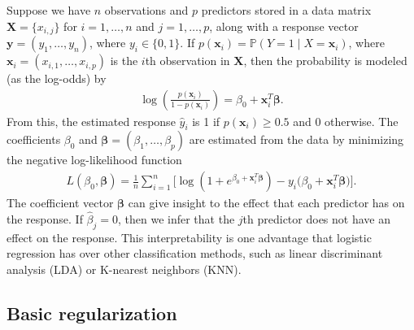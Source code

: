 \documentclass[11pt]{article}
\begin{document}
Suppose we have $n$ observations and $p$ predictors stored in a data matrix $\mathbf{X} = \{ x_{i,j} \}$ for $i = 1, \ldots, n$ and $j = 1, \ldots, p$, along with a response vector $\mathbf{y} = (y_1, \ldots, y_n)$, where $y_i \in \{ 0,1 \}$. If $p(\bm{x}_i) = \mathbb{P}(Y = 1 \mid X = \bm{x}_i)$, where $\bm{x}_i = (x_{i,1}, \ldots, x_{i,p})$ is the $i$th observation in $\mathbf{X}$,
then the probability is modeled (as the log-odds) by
\begin{align}
    \label{logprob}
    \log \left( \frac{p(\bm{x}_i)}{1 - p(\bm{x}_i)} \right) = \beta_0 + \bm{x}_i^T \bm{\beta}.
\end{align}
From this, the estimated response $\hat{y}_i$ is 1 if $p(\bm{x}_i) \ge 0.5$ and 0 otherwise. The coefficients $\beta_0$ and $\bm{\beta} = (\beta_1, \ldots, \beta_p)$ are estimated from the data by minimizing the negative log-likelihood function
\begin{align}
\label{negloglike}
    L (\beta_0, \bm{\beta}) = \frac{1}{n} \sum_{i = 1}^n \Big[ \log \left(1 + e^{\beta_0 + \bm{x}_i^T \bm{\beta}}  \right)  - y_i \big(\beta_0 + \bm{x}_i^T \bm{\beta} \big)\Big].
\end{align}
The coefficient vector $\bm{\beta}$ can give insight to the effect that each predictor has on the response. If $\hat{\beta}_j = 0$, then we infer that the $j$th predictor does not have an effect on the response. This interpretability is one advantage that logistic regression has over other classification methods, such as linear discriminant analysis (LDA) or K-nearest neighbors (KNN). 

\subsection{Basic regularization}


\end{document}
